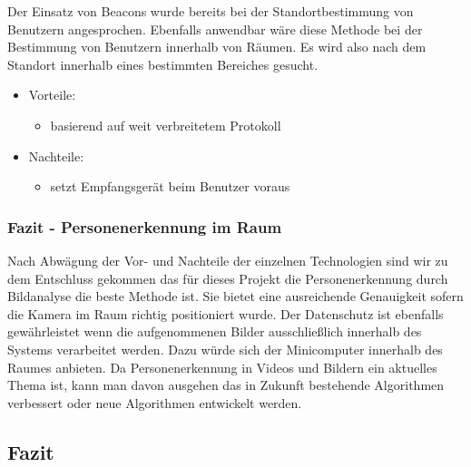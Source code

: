 Der Einsatz von Beacons wurde bereits bei der Standortbestimmung von Benutzern
angesprochen. Ebenfalls anwendbar wäre diese Methode bei der Bestimmung von
Benutzern innerhalb von Räumen.
Es wird also nach dem Standort innerhalb eines bestimmten Bereiches gesucht. 

\begin{itemize}
	\item Vorteile:
	\begin{itemize}
		\item basierend auf weit verbreitetem Protokoll
	\end{itemize}
	\item Nachteile:
	\begin{itemize}
		\item setzt Empfangsgerät beim Benutzer voraus
	\end{itemize}
\end{itemize}


\subsubsection{Fazit - Personenerkennung im Raum}
\label{sec:Fazit_Personenerkennung_im_Raum}

Nach Abwägung der Vor- und Nachteile der einzelnen Technologien sind wir zu dem
Entschluss gekommen das für dieses Projekt die Personenerkennung durch
Bildanalyse die beste Methode ist. Sie bietet eine ausreichende Genauigkeit
sofern die Kamera im Raum richtig positioniert wurde. Der Datenschutz ist
ebenfalls gewährleistet wenn die aufgenommenen Bilder ausschließlich innerhalb
des Systems verarbeitet werden. Dazu würde sich der Minicomputer innerhalb des
Raumes anbieten. Da Personenerkennung in Videos und Bildern ein aktuelles Thema
ist, kann man davon ausgehen das in Zukunft bestehende Algorithmen verbessert
oder neue Algorithmen entwickelt werden.


\subsection{Fazit}
\label{Fazit}

